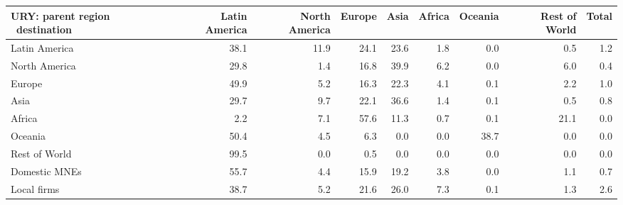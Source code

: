 \begin{tabular}{lrrrrrrrr}
\toprule
URY: parent region \ destination & Latin America & North America & Europe & Asia & Africa & Oceania & Rest of World & Total \\
\midrule
Latin America & 38.1 & 11.9 & 24.1 & 23.6 & 1.8 & 0.0 & 0.5 & 1.2 \\
North America & 29.8 & 1.4 & 16.8 & 39.9 & 6.2 & 0.0 & 6.0 & 0.4 \\
Europe & 49.9 & 5.2 & 16.3 & 22.3 & 4.1 & 0.1 & 2.2 & 1.0 \\
Asia & 29.7 & 9.7 & 22.1 & 36.6 & 1.4 & 0.1 & 0.5 & 0.8 \\
Africa & 2.2 & 7.1 & 57.6 & 11.3 & 0.7 & 0.1 & 21.1 & 0.0 \\
Oceania & 50.4 & 4.5 & 6.3 & 0.0 & 0.0 & 38.7 & 0.0 & 0.0 \\
Rest of World & 99.5 & 0.0 & 0.5 & 0.0 & 0.0 & 0.0 & 0.0 & 0.0 \\
Domestic MNEs & 55.7 & 4.4 & 15.9 & 19.2 & 3.8 & 0.0 & 1.1 & 0.7 \\
Local firms & 38.7 & 5.2 & 21.6 & 26.0 & 7.3 & 0.1 & 1.3 & 2.6 \\
\bottomrule
\end{tabular}
